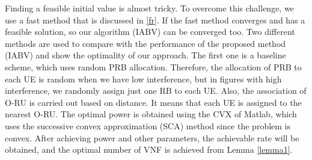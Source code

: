 \documentclass[lettersize,journal]{IEEEtran}
\begin{document}
\begin{table}[H]
 \caption {Simulation Parameters} \label{table:1a}
 \begin{center}
 \end{center}
 \end{table}
 
Finding a feasible initial value is almost tricky. To overcome this challenge, we use a fast method that is discussed in \ref{fr}. If the fast method converges and has a feasible solution, so our algorithm (IABV) can be converged too.
Two different methods are used to compare with the performance of the proposed method (IABV) and show the optimality of our approach.
The first one is a baseline scheme, which uses random PRB allocation. Therefore, the allocation of PRB to each UE is random when we have low interference, but in figures with high interference, we randomly assign just one RB to each UE. Also, the association of O-RU is carried out based on distance. It means that each UE is assigned to the nearest O-RU. The optimal power is obtained using the CVX of Matlab, which uses the successive convex approximation (SCA) method since the problem is convex.
After achieving power and other parameters, the achievable rate will be obtained, and the optimal number of VNF is achieved from Lemma \eqref{lemma1}.
\end{document}
